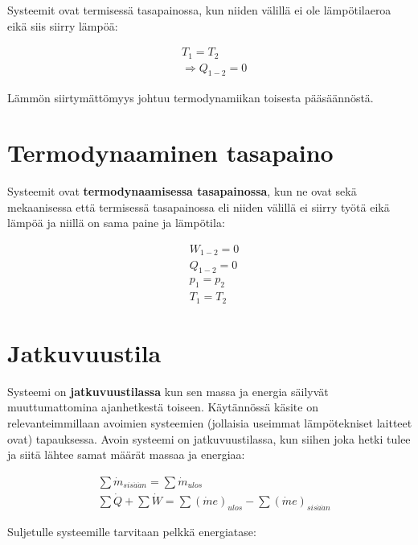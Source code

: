 \documentclass[12pt,a4paper,finnish]{book}
\begin{document}
Systeemit ovat termisessä tasapainossa, kun niiden välillä ei ole lämpötilaeroa eikä 
siis siirry lämpöä:

\begin{align}
 &T_{1} = T_{2}\\
  &\Rightarrow Q_{1-2} = 0
\end{align}

Lämmön siirtymättömyys johtuu termodynamiikan toisesta pääsäännöstä.

\section{Termodynaaminen tasapaino}

Systeemit ovat \textbf{termodynaamisessa tasapainossa}, kun ne ovat sekä mekaanisessa että 
termisessä tasapainossa eli niiden välillä ei siirry työtä eikä lämpöä ja niillä on sama 
paine ja lämpötila:

\begin{align}
 &W_{1-2} = 0\\
 &Q_{1-2} = 0\\
 &p_1 = p_2\\
 &T_1 = T_2
\end{align}


\section{Jatkuvuustila}

Systeemi on \textbf{jatkuvuustilassa} kun sen massa ja energia säilyvät muuttumattomina 
ajanhetkestä toiseen. Käytännössä käsite on relevanteimmillaan avoimien systeemien (jollaisia useimmat 
lämpötekniset laitteet ovat) tapauksessa. Avoin systeemi on jatkuvuustilassa, kun siihen joka 
hetki tulee ja siitä lähtee samat määrät massaa ja energiaa:

\begin{align}
 &\sum \dot{m}_{sis\ddot{a}\ddot{a}n} = \sum \dot{m}_{ulos}\\
 &\sum\dot{Q} + \sum\dot{W} = \sum (\dot{m}e)_{ulos} - \sum (\dot{m}e)_{sis\ddot{a}\ddot{a}n}
\end{align}

Suljetulle systeemille tarvitaan pelkkä energiatase:
\end{document}
